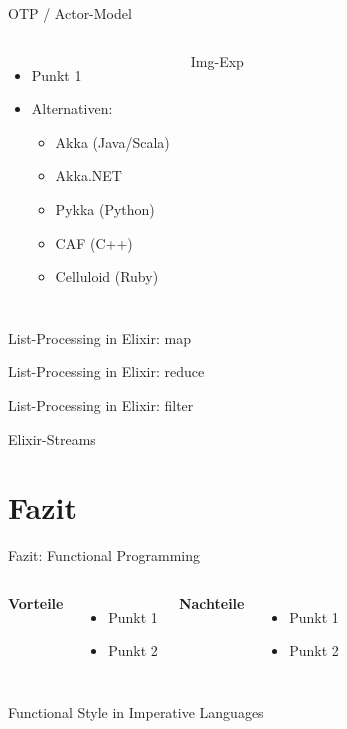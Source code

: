 \documentclass[compress]{beamer}
\begin{document}
  \begin{frame}{OTP / Actor-Model}
    \begin{columns}[c]
    \begin{itemize}
      \item Punkt 1
      \item Alternativen:
        \begin{itemize}
          \item Akka (Java/Scala)
          \item Akka.NET
          \item Pykka (Python)
          \item CAF (C++)
          \item Celluloid (Ruby)
        \end{itemize}
    \end{itemize}
      Img-Exp
    \end{columns}
  \end{frame}
  
  \begin{frame}{List-Processing in Elixir: map}
  \end{frame}

  \begin{frame}{List-Processing in Elixir: reduce}
  \end{frame}

  \begin{frame}{List-Processing in Elixir: filter}
  \end{frame}

  \begin{frame}{Elixir-Streams}
  \end{frame}

\section{Fazit}
  \begin{frame}{Fazit: Functional Programming}
    \begin{columns}[c]
      \textbf{Vorteile}
      \begin{itemize}
        \item Punkt 1
        \item Punkt 2
      \end{itemize}
      \textbf{Nachteile}
      \begin{itemize}
        \item Punkt 1
        \item Punkt 2
      \end{itemize}
    \end{columns}
  \end{frame}
  
  \begin{frame}{Functional Style in Imperative Languages}
  \end{frame}
\end{document}
